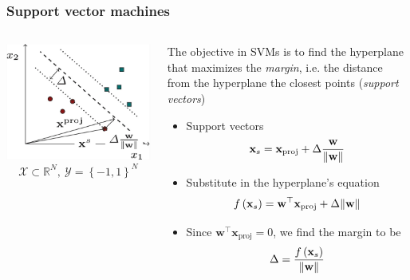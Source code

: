 \documentclass[aspectratio=43]{beamer}
\newcommand{\R}{\mathbb{R}}  %
\begin{document}
\begin{frame}
  \frametitle{Support vector machines}

  \begin{columns}[onlytextwidth]
    \begin{column}{.5\textwidth}
      \centering
      \includegraphics[width=\textwidth]{pics/supp-vecs.png}
      \[\mathcal{X} \subset \R^N,\: \mathcal{Y} = \left\{ -1,1 \right\}^N\]
    \end{column}
    \begin{column}{.5\textwidth}
      \small
      The objective in SVMs is to find the hyperplane that maximizes the \emph{margin}, i.e. the distance from the hyperplane the closest points (\emph{support vectors})
      \begin{itemize}
        \item<2-> Support vectors
        \[\mathbf{x}_s = \mathbf{x}_\mathrm{proj} + \Delta \frac{\mathbf{w}}{\norm{\mathbf{w}}}\]
        \item<3-> Substitute in the hyperplane's equation
        \[f\left( \mathbf{x}_s \right)=\mathbf{w}^\top\mathbf{x}_\mathrm{proj} + \Delta\norm{\mathbf{w}}\]
        \item<4-> Since $\mathbf{w}^\top\mathbf{x}_\mathrm{proj}=0$, we find the margin to be
        \[\Delta = \frac{f\left( \mathbf{x}_s \right)}{\norm{\mathbf{w}}}\]
      \end{itemize}
    \end{column}
\end{columns}

\end{frame}
\end{document}

